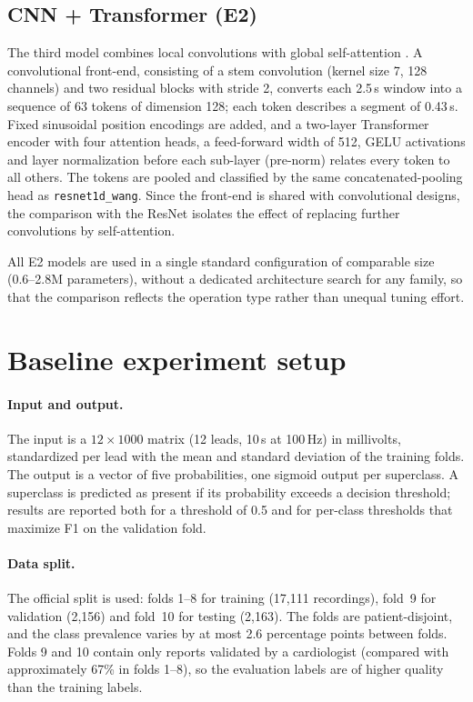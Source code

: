 \documentclass{article}
\newcommand{\wang}{\texttt{resnet1d\_wang}}
\begin{document}
\subsection{CNN + Transformer (E2)}

The third model combines local convolutions with global self-attention \citep{vaswani2017}. A convolutional front-end, consisting of a stem convolution (kernel size 7, 128 channels) and two residual blocks with stride 2, converts each 2.5\,s window into a sequence of 63 tokens of dimension 128; each token describes a segment of 0.43\,s. Fixed sinusoidal position encodings are added, and a two-layer Transformer encoder with four attention heads, a feed-forward width of 512, GELU activations and layer normalization before each sub-layer (pre-norm) relates every token to all others. The tokens are pooled and classified by the same concatenated-pooling head as \wang{}. Since the front-end is shared with convolutional designs, the comparison with the ResNet isolates the effect of replacing further convolutions by self-attention.

All E2 models are used in a single standard configuration of comparable size (0.6--2.8M parameters), without a dedicated architecture search for any family, so that the comparison reflects the operation type rather than unequal tuning effort.

\section{Baseline experiment setup}
\label{sec:setup}

\paragraph{Input and output.} The input is a $12\times1000$ matrix (12 leads, 10\,s at 100\,Hz) in millivolts, standardized per lead with the mean and standard deviation of the training folds. The output is a vector of five probabilities, one sigmoid output per superclass. A superclass is predicted as present if its probability exceeds a decision threshold; results are reported both for a threshold of 0.5 and for per-class thresholds that maximize F1 on the validation fold.

\paragraph{Data split.} The official split is used: folds 1--8 for training (17,111 recordings), fold~9 for validation (2,156) and fold~10 for testing (2,163). The folds are patient-disjoint, and the class prevalence varies by at most 2.6 percentage points between folds. Folds 9 and 10 contain only reports validated by a cardiologist (compared with approximately 67\% in folds 1--8), so the evaluation labels are of higher quality than the training labels.
\end{document}
